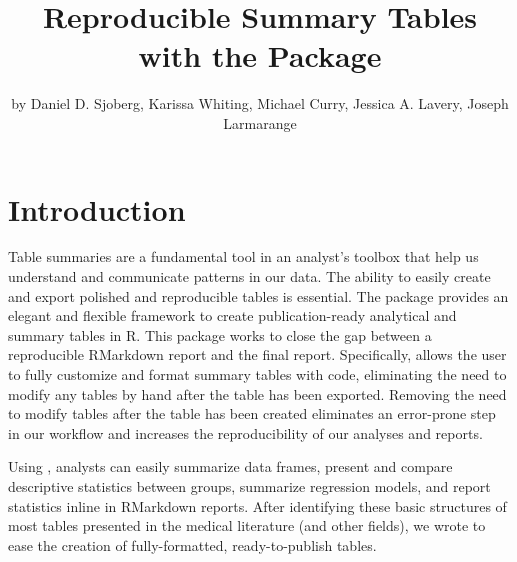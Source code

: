 \title{Reproducible Summary Tables with the  Package}
\author{by Daniel D. Sjoberg, Karissa Whiting, Michael Curry, Jessica A. Lavery, Joseph Larmarange}

\maketitle



\section{Introduction}

Table summaries are a fundamental tool in an analyst's toolbox that help us understand and communicate patterns in our data.
The ability to easily create and export polished and reproducible tables is essential.
The  \citep{gtsummary} package provides an elegant and flexible framework to create publication-ready analytical and summary tables in R.
This package works to close the gap between a reproducible RMarkdown report and the final report.
Specifically,  allows the user to fully customize and format summary tables with code, eliminating the need to modify any tables by hand after the table has been exported.
Removing the need to modify tables after the table has been created eliminates an error-prone step in our workflow and increases the reproducibility of our analyses and reports.

Using , analysts can easily summarize data frames, present and compare descriptive statistics between groups, summarize regression models, and report statistics inline in RMarkdown reports.
After identifying these basic structures of most tables presented in the medical literature (and other fields), we wrote  to ease the creation of fully-formatted, ready-to-publish tables.

